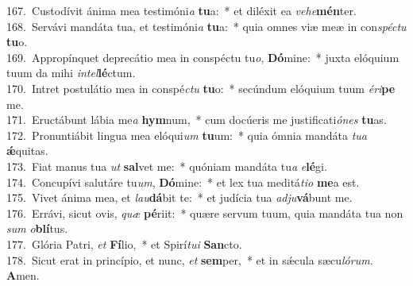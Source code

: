 {167.~}Custodívit ánima mea testimóni\textit{a} \textbf{tu}a:~* et diléxit ea \textit{ve}\textit{he}\textbf{mén}ter.\\
{168.~}Servávi mandáta tua, et testimóni\textit{a} \textbf{tu}a:~* quia omnes viæ meæ in con\textit{spé}\textit{ctu} \textbf{tu}o.\\
{169.~}Appropínquet deprecátio mea in conspéctu tu\textit{o}, \textbf{Dó}mine:~* juxta elóquium tuum da mihi \textit{in}\textit{tel}\textbf{lé}ctum.\\
{170.~}Intret postulátio mea in conspé\textit{ctu} \textbf{tu}o:~* secúndum elóquium tuum \textit{é}\textit{ri}\textbf{pe} me.\\
{171.~}Eructábunt lábia me\textit{a} \textbf{hym}num,~* cum docúeris me justificati\textit{ó}\textit{nes} \textbf{tu}as.\\
{172.~}Pronuntiábit lingua mea elóqui\textit{um} \textbf{tu}um:~* quia ómnia mandáta \textit{tu}\textit{a} \textbf{ǽ}quitas.\\
{173.~}Fiat manus tua \textit{ut} \textbf{sal}vet me:~* quóniam mandáta tu\textit{a} \textit{e}\textbf{lé}gi.\\
{174.~}Concupívi salutáre tu\textit{um}, \textbf{Dó}mine:~* et lex tua meditá\textit{ti}\textit{o} \textbf{me}a est.\\
{175.~}Vivet ánima mea, et \textit{lau}\textbf{dá}bit te:~* et judícia tua \textit{ad}\textit{ju}\textbf{vá}bunt me.\\
{176.~}Errávi, sicut ovis, \textit{quæ} \textbf{pé}riit:~* quære servum tuum, quia mandáta tua non \textit{sum} \textit{o}\textbf{blí}tus.\\
{177.~}Glória Patri, \textit{et} \textbf{Fí}lio,~* et Spirí\textit{tu}\textit{i} \textbf{San}cto.\\
{178.~}Sicut erat in princípio, et nunc, \textit{et} \textbf{sem}per,~* et in sǽcula sæcu\textit{ló}\textit{rum}. \textbf{A}men.\\
